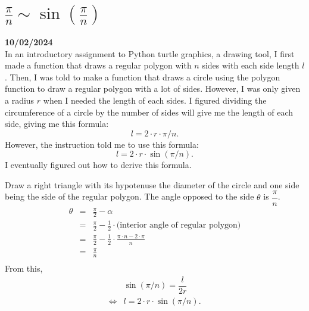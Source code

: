 \documentclass[12pt, oneside]{article}
\begin{document}
\section*{$\frac{\pi}{n} \sim \sin(\frac{\pi}{n})$}
\textbf{10/02/2024}\\
In an introductory assignment to Python turtle graphics, a drawing tool, I first made a function that draws a regular polygon with $n$ sides with each side length $l$. Then, I was told to make a function that draws a circle using the polygon function to draw a regular polygon with a lot of sides. However, I was only given a radius $r$ when I needed the length of each sides. I figured dividing the circumference of a circle by the number of sides will give me the length of each side, giving me this formula: \[l = 2 \cdot r \cdot \pi / n.\] However, the instruction told me to use this formula: \[l = 2 \cdot r \cdot \sin(\pi / n).\] I eventually figured out how to derive this formula.
\begin{center}
\end{center}
Draw a right triangle with its hypotenuse the diameter of the circle and one side being the side of the regular polygon. The angle opposed to the side $\theta$ is $\dfrac{\pi}{n}$.
\begin{eqnarray*}
\theta & = & \frac{\pi}{2} - \alpha\\
& = & \frac{\pi}{2} - \frac{1}{2} \cdot \text{(interior angle of regular polygon)}\\
& = & \frac{\pi}{2} - \frac{1}{2} \cdot \frac{\pi \cdot n - 2 \cdot \pi}{n}\\
& = & \frac{\pi}{n}\\
\end{eqnarray*}
From this, 
\begin{eqnarray*}
& \sin(\pi/n) = \dfrac{l}{2r}\\
\Leftrightarrow & l = 2 \cdot r \cdot \sin(\pi/n).
\end{eqnarray*}
\end{document}
